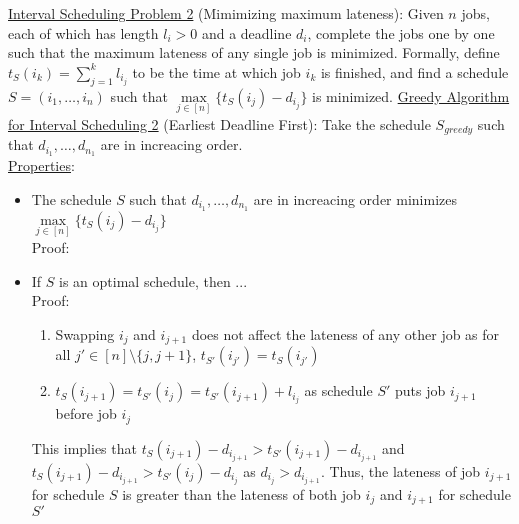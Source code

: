 \documentclass{article}
\begin{document}
\underline{Interval Scheduling Problem 2} (Mimimizing maximum lateness): Given $n$ jobs, each of which has length $l_i > 0$ and a deadline $d_i$, complete the jobs one by one such that the maximum lateness of any single job is minimized. Formally, define $t_S(i_k) = \sum_{j = 1}^{k}l_{i_j}$ to be the time at which job $i_k$ is finished, and find a schedule $S = (i_1, \dots, i_n)$ such that $\underset{{j \in [n]}}{\max}\{t_S(i_j) - d_{i_j}\}$ is minimized.
\underline{Greedy Algorithm for Interval Scheduling 2} (Earliest Deadline First): Take the schedule $S_{greedy}$ such that $d_{i_1},\dots,d_{n_1}$ are in increacing order. \\[1.0ex]
\underline{Properties}:
\begin{itemize}
    \item The schedule $S$ such that $d_{i_1},\dots,d_{n_1}$ are in increacing order minimizes $\underset{{j \in [n]}}{\max}\{t_S(i_j) - d_{i_j}\}$ \\
    Proof: 
    \item If $S$ is an optimal schedule, then ...\\
    Proof: 
    \begin{enumerate}
        \item Swapping $i_j$ and $i_{j + 1}$ does not affect the lateness of any other job as for all $j' \in [n] \setminus \{j, j + 1\}$, $t_{S'}(i_{j'}) = t_{S}(i_{j'})$
        \item $t_S(i_{j + 1}) = t_{S'}(i_{j}) = t_{S'}(i_{j + 1}) + l_{i_j}$ as schedule $S'$ puts job $i_{j + 1}$ before job $i_j$
    \end{enumerate}
    This implies that $t_S(i_{j + 1}) - d_{i_{j + 1}} > t_{S'}(i_{j + 1}) - d_{i_{j + 1}} $ and  $t_S(i_{j + 1}) - d_{i_{j + 1}} > t_{S'}(i_{j}) - d_{i_{j}} $ as $d_{i_j} > d_{i_{j + 1}}$. Thus, the lateness of job $i_{j + 1}$ for schedule $S$ is greater than the lateness of both job $i_j$ and $i_{j + 1}$ for schedule $S'$
\end{itemize}
\end{document}
